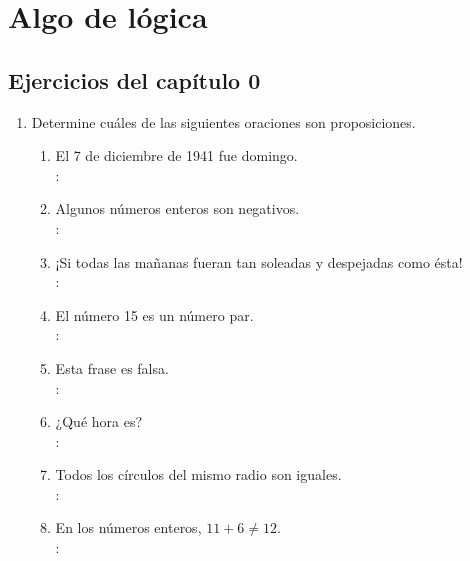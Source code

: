 \chapter{Algo de lógica}

\setcounter{section}{3}
\section{Ejercicios del capítulo 0}

\begin{enumerate}[label=0.1.\arabic*]
	\item Determine cuáles de las siguientes oraciones son proposiciones.
	\begin{enumerate}[label=(\arabic*)]
		\item El 7 de diciembre de 1941 fue domingo. \\
		\solucion: \\
		
		\item Algunos números enteros son negativos. \\
		\solucion: \\
		
		\item ¡Si todas las mañanas fueran tan soleadas y despejadas como ésta! \\
		\solucion: \\
		
		\item El número 15 es un número par. \\
		\solucion: \\
		
		\item Esta frase es falsa. \\
		\solucion: \\
		
		\item ¿Qué hora es? \\
		\solucion: \\
		
		\item Todos los círculos del mismo radio son iguales. \\
		\solucion: \\
		
		\item En los números enteros, $ 11+6 \neq 12 $. \\
		\solucion: \\
		

\end{enumerate}
\end{enumerate}
